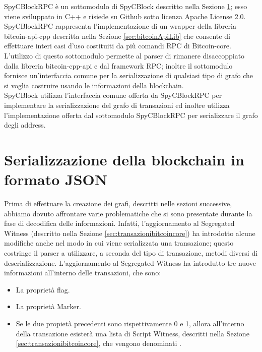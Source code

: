 SpyCBlockRPC è un sottomodulo di SpyCBlock descritto nella Sezione \ref{sec:spycblock}; esso viene sviluppato in C++ e risiede su Github sotto licenza Apache License 2.0.\\
SpyCBlockRPC rappresenta l'implementazione di un wrapper della libreria bitcoin-api-cpp descritta nella Sezione \ref{sec:bitcoinApiLib} che consente di effettuare interi casi d'uso costituiti da più comandi RPC di Bitcoin-core.
L'utilizzo di questo sottomodulo permette al parser di rimanere disaccoppiato dalla libreria bitcoin-cpp-api e dal framework RPC; inoltre il sottomodulo fornisce un'interfaccia comune per la serializzazione di qualsiasi tipo di grafo che si voglia costruire usando le informazioni della blockchain.\\
SpyCBlock utilizza l'interfaccia comune offerta da SpyCBlockRPC per implementare la serializzazione del grafo di transazioni ed inoltre utilizza l'implementazione offerta dal sottomodulo SpyCBlockRPC per serializzare il grafo degli address.

\section{Serializzazione della blockchain in formato JSON} \label{sec:spycblock}

Prima di effettuare la creazione dei grafi, descritti nelle sezioni successive, abbiamo dovuto affrontare varie problematiche che si sono presentate durante la fase di decodifica delle informazioni. Infatti, l'aggiornamento al Segregated Witness (descritto nella Sezione \ref{sec:transazionibitcoincore}) ha introdotto alcune modifiche anche nel modo in cui viene serializzata una transazione; questo costringe il parser a utilizzare, a seconda del tipo di transazione, metodi diversi di deserializzazione.
L'aggiornamento al Segregated Witness ha introdutto tre nuove informazioni all'interno delle transazioni, che sono:
\begin{itemize}
  \item La proprietà flag.
  \item La proprietà Marker.
  \item Se le due propietà precedenti sono rispettivamente 0 e 1, allora all'interno della transazione esisterà una lista di Script Witness, descritti nella Sezione \ref{sec:transazionibitcoincore}, che vengono denominati .
\end{itemize}

